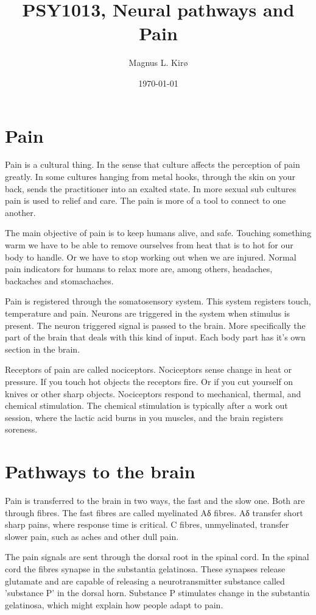 \documentclass[12pt, a4paper]{article}
\title{
	PSY1013, Neural pathways and Pain
}
\author{
	Magnus L. Kirø \\
}
\date{\today}
\begin{document}
\maketitle
{}

\section{Pain}
Pain is a cultural thing. In the sense that culture affects the perception of
pain greatly. In some cultures hanging from metal hooks, through the skin on your
back, sends the practitioner into an exalted state. In more sexual sub cultures
pain is used to relief and care. The pain is more of a tool to connect to one
another. 

The main objective of pain is to keep humans alive, and safe. Touching something warm we
have to be able to remove ourselves from heat that is to hot for our body to
handle. Or we have to stop working out when we are injured. Normal pain
indicators for humans to relax more are, among others, headaches, backaches and stomachaches. 

Pain is registered through the somatosensory system. This system registers
touch, temperature and pain. Neurons are triggered in the system when stimulus
is present. The neuron triggered signal is passed to the brain. More
specifically the part of the brain that deals with this kind of input. Each
body part has it's own section in the brain.  

Receptors of pain are called nociceptors. Nociceptors sense change in heat or
pressure. If you touch hot objects the receptors fire. Or if you cut yourself
on knives or other sharp objects. Nociceptors respond to mechanical, thermal,
and chemical stimulation. The chemical stimulation is typically after a work
out session, where the lactic acid burns in you muscles, and the brain
registers soreness.   

\section{Pathways to the brain}
Pain is transferred to the brain in two ways, the fast and the slow one. Both
are through fibres. The fast fibres are called myelinated Aδ fibres. Aδ
transfer short sharp pains, where response time is critical. C fibres,
unmyelinated, transfer slower pain, such as aches and other dull pain. 

The pain signals are sent through the dorsal root in the spinal cord. In the
spinal cord the fibres synapse in the substantia gelatinosa. These synapses
release glutamate and are capable of releasing a neurotransmitter substance
called 'substance P' in the dorsal horn. Substance P stimulates change in the substantia
gelatinosa, which might explain how people adapt to pain.
\end{document}
